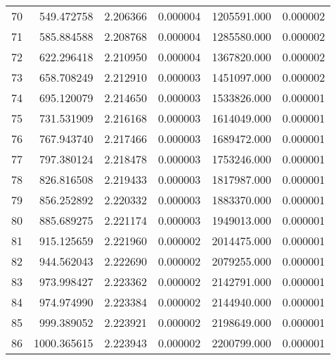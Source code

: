 \begin{tabular}{lrrrrr}
70 &   549.472758 &  2.206366 &  0.000004 &  1205591.000 &  0.000002 \\
71 &   585.884588 &  2.208768 &  0.000004 &  1285580.000 &  0.000002 \\
72 &   622.296418 &  2.210950 &  0.000004 &  1367820.000 &  0.000002 \\
73 &   658.708249 &  2.212910 &  0.000003 &  1451097.000 &  0.000002 \\
74 &   695.120079 &  2.214650 &  0.000003 &  1533826.000 &  0.000001 \\
75 &   731.531909 &  2.216168 &  0.000003 &  1614049.000 &  0.000001 \\
76 &   767.943740 &  2.217466 &  0.000003 &  1689472.000 &  0.000001 \\
77 &   797.380124 &  2.218478 &  0.000003 &  1753246.000 &  0.000001 \\
78 &   826.816508 &  2.219433 &  0.000003 &  1817987.000 &  0.000001 \\
79 &   856.252892 &  2.220332 &  0.000003 &  1883370.000 &  0.000001 \\
80 &   885.689275 &  2.221174 &  0.000003 &  1949013.000 &  0.000001 \\
81 &   915.125659 &  2.221960 &  0.000002 &  2014475.000 &  0.000001 \\
82 &   944.562043 &  2.222690 &  0.000002 &  2079255.000 &  0.000001 \\
83 &   973.998427 &  2.223362 &  0.000002 &  2142791.000 &  0.000001 \\
84 &   974.974990 &  2.223384 &  0.000002 &  2144940.000 &  0.000001 \\
85 &   999.389052 &  2.223921 &  0.000002 &  2198649.000 &  0.000001 \\
86 &  1000.365615 &  2.223943 &  0.000002 &  2200799.000 &  0.000001 \\
\bottomrule
\end{tabular}
